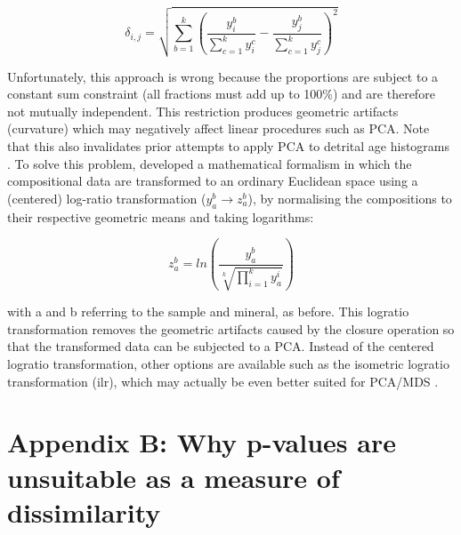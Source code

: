 \documentclass[authoryear,preprint,review,12pt]{elsarticle}
\begin{document}
\begin{equation}
\delta_{i,j} = \sqrt{\sum_{b=1}^k
\left(\frac{y_i^b}{\sum_{c=1}^{k}y_i^c}-
\frac{y_j^b}{\sum_{c=1}^{k}y_j^c}\right)^2}
\label{eq:euclidean-proportions}
\end{equation}

Unfortunately, this approach is wrong because the proportions are
subject to a constant sum constraint (all fractions must add up to
100\%) and are therefore not mutually independent.  This restriction
produces geometric artifacts (curvature) which may negatively affect
linear procedures such as PCA.  Note that this also invalidates prior
attempts to apply PCA to detrital age histograms \citep{sircombe2000}.
To solve this problem, \citet{aitchison1982, aitchison1983,
  aitchison1986} developed a mathematical formalism in which the
compositional data are transformed to an ordinary Euclidean space
using a (centered) log-ratio transformation ($y_a^b \rightarrow
z_a^b$), by normalising the compositions to their respective geometric
means and taking logarithms:

\begin{equation}
z_a^b=ln\left(\frac{y_a^b}{\sqrt[k]{\prod_{i=1}^ky_a^i}}\right)
\label{eq:clr}
\end{equation}

with a and b referring to the sample and mineral, as before.  This
logratio transformation removes the geometric artifacts caused by the
closure operation so that the transformed data can be subjected to a
PCA. Instead of the centered logratio transformation, other options
are available such as the isometric logratio transformation (ilr),
which may actually be even better suited for PCA/MDS
\citep{egozcue2003, filzmoser2009}.

\section*{Appendix B: Why p-values are unsuitable as a measure of dissimilarity}
\end{document}
